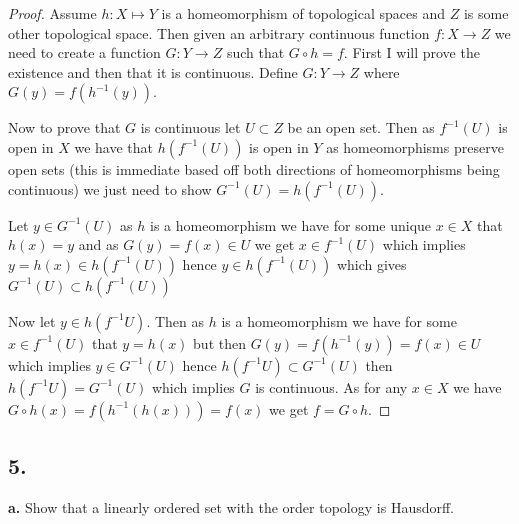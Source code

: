 \documentclass{amsart}
\theoremstyle{plain}
\theoremstyle{definition}
\theoremstyle{remark}
\begin{document}
\begin{proof}
  Assume $h:X\mapsto Y$ is a homeomorphism of topological spaces and $Z$ is some other topological space. Then given an arbitrary continuous function $f:X\to Z$ we need to create a function $G: Y\to Z$ such that $G\circ h=f$. First I will prove the existence and then that it is continuous. Define $G: Y \to Z$ where $G(y)=f(h^{-1}(y))$.
  
  Now to prove that $G$ is continuous let $U\subset Z$ be an open set. Then as $f^{-1}(U)$ is open in $X$ we have that $h(f^{-1}(U))$ is open in $Y$ as homeomorphisms preserve open sets (this is immediate based off both directions of homeomorphisms being continuous) we just need to show $G^{-1}(U)=h(f^{-1}(U))$. 
  
  Let $y\in G^{-1}(U)$ as $h$ is a homeomorphism we have for some unique $x\in X$ that $h(x)= y $  and as $G(y)=f(x)\in U$ we get $x\in f^{-1}(U)$ which implies $y=h(x)\in h(f^{-1}(U))$ hence $y\in h(f^{-1}(U))$ which gives $G^{-1}(U)\subset h(f^{-1}(U))$ 

  Now let $y\in h(f^{-1}U)$. Then as $h$ is a homeomorphism we have for some $x\in f^{-1}(U)$ that $y=h(x)$ but then $G(y)=f(h^{-1}(y))=f(x)\in U$ which implies $y\in G^{-1}(U)$ hence $h(f^{-1}U)\subset G^{-1}(U)$ then $h(f^{-1}U)=G^{-1}(U)$ which implies $G$ is continuous. As for any $x\in X$ we have $G\circ h (x)=f(h^{-1}(h(x)))=f(x)$ we get $f=G\circ h$. 
\end{proof}

\noindent
\subsection*{5.}

{\bf a.} Show that a linearly ordered set with the order topology is Hausdorff. 
\end{document}
